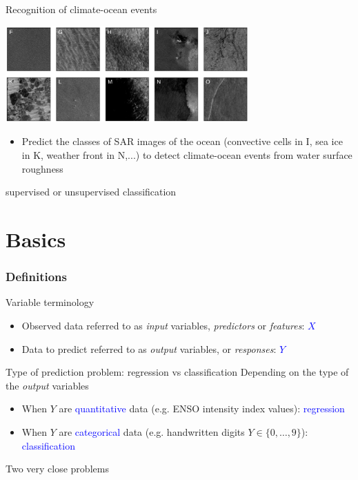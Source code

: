 \documentclass[pressentation,9pt,aspectratio=1610,xcolor=table]{beamer}
\newcommand{\structuretext}[1]{{\textcolor{blue}{#1}}}
\newcommand{\doigt}{\noindent \Pisymbol{pzd}{43}}
\begin{document}
\begin{frame}{Recognition of climate-ocean events}

  \begin{center}
    \includegraphics[keepaspectratio=true,width=0.7\textwidth]{SAR_classes.png}
  \end{center}
  \begin{itemize}
  \item[\doigt] Predict the classes of SAR images  of the ocean (convective cells in I, sea ice in K, weather front in N,...) to detect
    climate-ocean events from water surface roughness
  \end{itemize}

  \begin{center}
    \alert{supervised or unsupervised classification}
  \end{center}

\end{frame}


\section{Basics}
\begin{frame}
  \frametitle{Definitions}
  \begin{block}{Variable terminology}
    \begin{itemize}
    \item Observed data referred to as {\em input} variables, {\em predictors} or {\em features}: \textcolor{blue}{$X$}
    \item Data to predict referred to as {\em output} variables, or {\em responses}: \textcolor{blue}{$Y$}
    \end{itemize}
  \end{block}

  \begin{block}{Type of prediction problem: regression vs classification}
    Depending on the type of the {\em output} variables
    \begin{itemize}
    \item When $Y$ are \structuretext{quantitative} data (e.g. ENSO intensity index values): \structuretext{regression}
    \item When $Y$ are \structuretext{categorical} data (e.g. handwritten digits $Y\in \{0,\ldots,9\}$): \structuretext{classification}
    \end{itemize}\medskip

    Two very close problems
  \end{block}
\end{frame}
\end{document}

